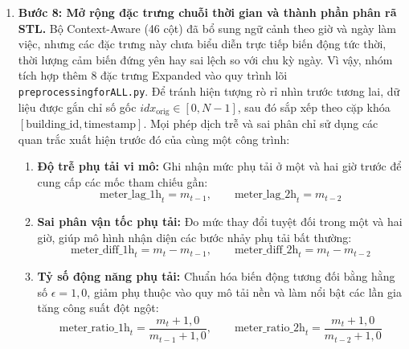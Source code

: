 \begin{enumerate}
    Đối với việc nhận diện các dị thường vi mô tại công trình \texttt{Building 32}, mức phụ tải \texttt{meter\_reading} ghi nhận $-0{,}208$. Nếu chỉ xét theo ngưỡng toàn cục, mức tải này rất dễ bị bỏ qua (do bản ghi bình thường nhận $-0{,}234$). Tuy nhiên vào ngày nghỉ, phụ tải này làm chỉ số \texttt{z\_meter\_workday} tăng vọt lên $+0{,}8362$ kết hợp biến tương tác \texttt{temp\_load\_inter} đạt $+0{,}6079$, tạo tín hiệu định lượng sắc bén giúp mô hình kịp thời phát hiện sự cố vận hành ngoài giờ làm việc.

    \item \textbf{Bước 8: Mở rộng đặc trưng chuỗi thời gian và thành phần phân rã STL.}
    Bộ Context-Aware (46 cột) đã bổ sung ngữ cảnh theo giờ và ngày làm việc, nhưng các đặc trưng này chưa biểu diễn trực tiếp biến động tức thời, thời lượng cảm biến đứng yên hay sai lệch so với chu kỳ ngày. Vì vậy, nhóm tích hợp thêm 8 đặc trưng Expanded vào quy trình lõi \texttt{preprocessingforALL.py}. Để tránh hiện tượng rò rỉ nhìn trước tương lai, dữ liệu được gắn chỉ số gốc $idx_{\text{orig}} \in [0,N-1]$, sau đó sắp xếp theo cặp khóa $[\text{building\_id},\text{timestamp}]$. Mọi phép dịch trễ và sai phân chỉ sử dụng các quan trắc xuất hiện trước đó của cùng một công trình:
    \begin{enumerate}
        \item \textbf{Độ trễ phụ tải vi mô:} Ghi nhận mức phụ tải ở một và hai giờ trước để cung cấp các mốc tham chiếu gần:
        \begin{equation*}
            \text{meter\_lag\_1h}_t=m_{t-1}, \qquad
            \text{meter\_lag\_2h}_t=m_{t-2}
        \end{equation*}
        \item \textbf{Sai phân vận tốc phụ tải:} Đo mức thay đổi tuyệt đối trong một và hai giờ, giúp mô hình nhận diện các bước nhảy phụ tải bất thường:
        \begin{equation*}
            \text{meter\_diff\_1h}_t=m_t-m_{t-1}, \qquad
            \text{meter\_diff\_2h}_t=m_t-m_{t-2}
        \end{equation*}
        \item \textbf{Tỷ số động năng phụ tải:} Chuẩn hóa biến động tương đối bằng hằng số $\epsilon=1{,}0$, giảm phụ thuộc vào quy mô tải nền và làm nổi bật các lần gia tăng công suất đột ngột:
        \begin{equation*}
            \text{meter\_ratio\_1h}_t=\frac{m_t+1{,}0}{m_{t-1}+1{,}0}, \qquad
            \text{meter\_ratio\_2h}_t=\frac{m_t+1{,}0}{m_{t-2}+1{,}0}

\end{equation*}
\end{enumerate}
\end{enumerate}

